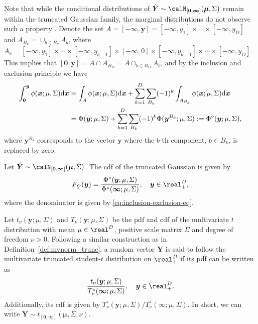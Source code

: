 \documentclass[12pt]{article}
\begin{document}
Note that while the conditional distributions of $\hat{\bm Y}\sim \calN_{\left[ \bm 0 , \bm \infty \right]}(\bm \mu, \Sigma)$ remain within the truncated Gaussian family, the marginal distributions do not observe such a property \citep{Horrace:2005}.
Denote the set $A = [-\bm \infty, \bm y] = [-\infty,y_1]\times\cdots\times[-\infty,y_D] $ and 
$A_{B_k} = \cup_{b\in B_k} A_b$, where $A_b = [-\infty,y_1]\times\cdots\times[-\infty,y_{b-1}]\times[-\infty,0]\times[-\infty,y_{b+1}]\times\cdots\times[-\infty,y_D]$.
This implies that 
$[\bm 0,\bm y] = A \cap \bar{A_{B_D}} = A \cap_{b \in B_D} \bar{A}_b$, 
and by the inclusion and exclusion principle we have
%
\begin{align}
\int_{\bm 0}^{\bm y} \phi(\bm x;\mu,\Sigma) \text d \bm x &= \int_{A} \phi(\bm x;\mu,\Sigma) \text d \bm x + \sum_{k=1}^D \sum_{B_k}(-1)^k \int_{A_{B_k}} \phi(\bm x;\mu,\Sigma) \text d \bm x   \nonumber \\
&= \Phi(\bm y;\mu,\Sigma) + \sum_{k=1}^D \sum_{B_k}(-1)^k \Phi(\bm y^{B_k};\mu,\Sigma):= \Phi^\circ(\bm y;\mu,\Sigma)\label{eq:inclusion-exclusion-eq},
\end{align}
%
where $\bm y^{B_k}$ corresponds to the vector $\bm y$ where the $b$-th component, $b\in B_k$, is replaced by zero. 
%
\begin{definition}
Let $\hat{\bm Y}\sim \calN_{\left[ \bm 0 , \bm \infty \right]}(\bm \mu, \Sigma)$. The cdf of the truncated Gaussian is given by
%
$$
F_{\hat{Y}}(\bm y) = \frac{\Phi^\circ(\bm y;\mu,\Sigma)}
{\Phi^\circ(\bm \infty;\mu,\Sigma)}, \quad \bm y \in \real^D_+,
$$
where the denominator is given by \eqref{eq:inclusion-exclusion-eq}.
\end{definition}

\begin{definition}
Let $t_\nu(\bm y; \mu, \Sigma)$ and $T_\nu(\bm y; \mu, \Sigma)$ be the pdf and cdf of the multivariate $t$ distribution with mean $\mu\in\real^D$, positive scale matrix $\Sigma$ and degree of freedom $\nu>0$. Following a similar construction as in Definition~\ref{def:mvnorm_trunc}, a random vector $\bm Y$ is said to follow the multivariate truncated student-$t$ distribution on $\real^D_+$ if its pdf can be written as
%
$$
\frac{t_\nu(\bm y; \mu, \Sigma)}{T_{\nu}^\circ( \bm \infty;\mu,\Sigma)}, \quad \bm y \in \real^D_+.
$$
%
Additionally, its cdf is given by $T_{\nu}^\circ( \bm y;\mu,\Sigma)/ T_{\nu}^\circ( \bm \infty;\mu,\Sigma)$. In short, we can write $\bm Y \sim t_{\left[ \bm 0 , \bm \infty \right]}(\bm \mu, \Sigma, \nu)$.
\end{definition}
\end{document}
